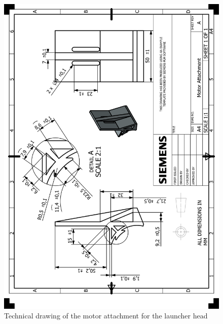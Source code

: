 \documentclass[12pt]{article}
\begin{document}
\begin{appendices}
\begin{figure}[H]
    \centering
    \includegraphics[width=\textwidth]{HP_Motor Attachment.png} 
    \caption{Technical drawing of the motor attachment for the launcher head}
    \label{fig:technical-drawing}
\end{figure}


\end{appendices}
\end{document}

